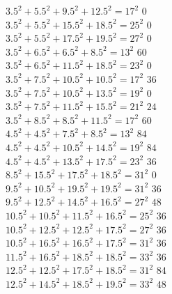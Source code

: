 \documentclass[12pt]{article}
\theoremstyle{definition}
\numberwithin{equation}{section}
\begin{document}
\begin{appendices}
{\begin{tabbing}
$3.5^2+ 5.5^2+ 9.5^2+ 12.5^2  = 17^2$ \>$0$\\
$3.5^2+ 5.5^2+ 15.5^2+ 18.5^2  = 25^2$ \>$0$\\
$3.5^2+ 5.5^2+ 17.5^2+ 19.5^2  = 27^2$ \>$0$\\
$3.5^2+ 6.5^2+ 6.5^2+ 8.5^2  = 13^2$ \>$60$\\
$3.5^2+ 6.5^2+ 11.5^2+ 18.5^2  = 23^2$ \>$0$\\
$3.5^2+ 7.5^2+ 10.5^2+ 10.5^2  = 17^2$ \>$36$\\
$3.5^2+ 7.5^2+ 10.5^2+ 13.5^2  = 19^2$ \>$0$\\
$3.5^2+ 7.5^2+ 11.5^2+ 15.5^2  = 21^2$ \>$24$\\
$3.5^2+ 8.5^2+ 8.5^2+ 11.5^2  = 17^2$ \>$60$\\
$4.5^2+ 4.5^2+ 7.5^2+ 8.5^2  = 13^2$ \>$84$\\
$4.5^2+ 4.5^2+ 10.5^2+ 14.5^2  = 19^2$ \>$84$\\
$4.5^2+ 4.5^2+ 13.5^2+ 17.5^2  = 23^2$ \>$36$\\
$8.5^2+ 15.5^2+ 17.5^2+ 18.5^2  = 31^2$ \>$0$\\
$9.5^2+ 10.5^2+ 19.5^2+ 19.5^2  = 31^2$ \>$36$\\
$9.5^2+ 12.5^2+ 14.5^2+ 16.5^2  = 27^2$ \>$48$\\
$10.5^2+ 10.5^2+ 11.5^2+ 16.5^2  = 25^2$ \>$36$\\
$10.5^2+ 12.5^2+ 12.5^2+ 17.5^2  = 27^2$ \>$36$\\
$10.5^2+ 16.5^2+ 16.5^2+ 17.5^2  = 31^2$ \>$36$\\
$11.5^2+ 16.5^2+ 18.5^2+ 18.5^2  = 33^2$ \>$36$\\
$12.5^2+ 12.5^2+ 17.5^2+ 18.5^2  = 31^2$ \>$84$\\
$12.5^2+ 14.5^2+ 18.5^2+ 19.5^2  = 33^2$ \>$48$\\
\end{tabbing}
}


\end{appendices}



\newpage

\newcommand{\journal}[6]{{\sc #1,} #2, {\it #3} {\bf #4} (#5), #6.}
\newcommand{\preprint}[3]{{\sc #1,} #2, preprint #3.}
\newcommand{\book}[4]{{\sc #1,} #2, #3, #4.}
\newcommand{\collection}[6]{{\sc #1,}  #2, #3, in {\it #4}, #5, #6.}
\newcommand{\JCTA}{J.\ Combin.\ Theory Ser.\ A}
\newcommand{\arxiv}[3]{{\sc #1,} #2, {\tt #3}.}
\newcommand{\article}[3]{{\sc #1,} #2, {\tt #3}.}
\newcommand{\journalfive}[5]{{\sc #1,} #2, {\it #3}  (#4), #5.}
\end{document}
